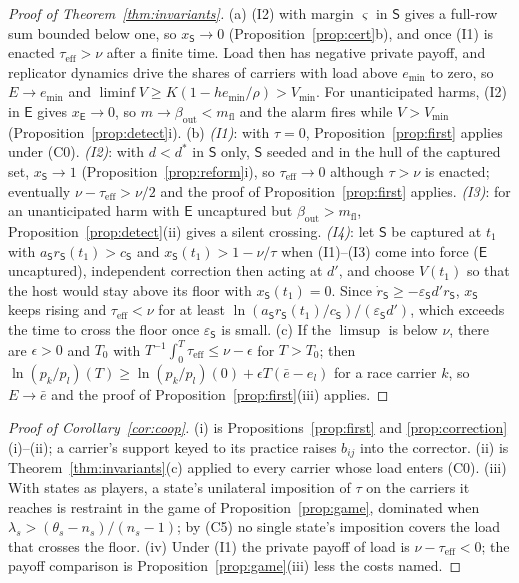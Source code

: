 \documentclass[letterpaper]{article} %
\theoremstyle{definition}
\newcommand{\dE}{\mathsf{E}}
\newcommand{\dS}{\mathsf{S}}
\newcommand{\Vmin}{V_{\min}}
\newcommand{\mfl}{m_{\mathrm{fl}}}
\newcommand{\taueff}{\tau_{\mathrm{eff}}}
\begin{document}
\begin{proof}[Proof of Theorem~\ref{thm:invariants}]
(a) (I2) with margin $\varsigma$ in $\dS$ gives a full-row sum bounded below one, so $x_\dS\to0$ (Proposition~\ref{prop:cert}b), and once (I1) is enacted $\taueff>\nu$ after a finite time. Load then has negative private payoff, and replicator dynamics drive the shares of carriers with load above $e_{\min}$ to zero, so $E\to e_{\min}$ and $\liminf V\ge K(1-he_{\min}/\rho)>\Vmin$. For unanticipated harms, (I2) in $\dE$ gives $x_\dE\to0$, so $m\to\beta_{\mathrm{out}}<\mfl$ and the alarm fires while $V>\Vmin$ (Proposition~\ref{prop:detect}i). (b) \emph{(I1)}: with $\tau=0$, Proposition~\ref{prop:first} applies under (C0). \emph{(I2)}: with $d<d^\ast$ in $\dS$ only, $\dS$ seeded and in the hull of the captured set, $x_\dS\to1$ (Proposition~\ref{prop:reform}i), so $\taueff\to0$ although $\tau>\nu$ is enacted; eventually $\nu-\taueff>\nu/2$ and the proof of Proposition~\ref{prop:first} applies. \emph{(I3)}: for an unanticipated harm with $\dE$ uncaptured but $\beta_{\mathrm{out}}>\mfl$, Proposition~\ref{prop:detect}(ii) gives a silent crossing. \emph{(I4)}: let $\dS$ be captured at $t_1$ with $a_\dS r_\dS(t_1)>c_\dS$ and $x_\dS(t_1)>1-\nu/\tau$ when (I1)--(I3) come into force ($\dE$ uncaptured), independent correction then acting at $d'$, and choose $V(t_1)$ so that the host would stay above its floor with $x_\dS(t_1)=0$. Since $\dot r_\dS\ge-\varepsilon_\dS d'r_\dS$, $x_\dS$ keeps rising and $\taueff<\nu$ for at least $\ln(a_\dS r_\dS(t_1)/c_\dS)/(\varepsilon_\dS d')$, which exceeds the time to cross the floor once $\varepsilon_\dS$ is small. (c) If the $\limsup$ is below $\nu$, there are $\epsilon>0$ and $T_0$ with $T^{-1}\int_0^T\taueff\le\nu-\epsilon$ for $T>T_0$; then $\ln(p_k/p_l)(T)\ge\ln(p_k/p_l)(0)+\epsilon T(\bar e-e_l)$ for a race carrier $k$, so $E\to\bar e$ and the proof of Proposition~\ref{prop:first}(iii) applies.
\end{proof}

\begin{proof}[Proof of Corollary~\ref{cor:coop}]
(i) is Propositions~\ref{prop:first} and \ref{prop:correction}(i)--(ii); a carrier's support keyed to its practice raises $b_{ij}$ into the corrector. (ii) is Theorem~\ref{thm:invariants}(c) applied to every carrier whose load enters (C0). (iii) With states as players, a state's unilateral imposition of $\tau$ on the carriers it reaches is restraint in the game of Proposition~\ref{prop:game}, dominated when $\lambda_s>(\theta_s-n_s)/(n_s-1)$; by (C5) no single state's imposition covers the load that crosses the floor. (iv) Under (I1) the private payoff of load is $\nu-\taueff<0$; the payoff comparison is Proposition~\ref{prop:game}(iii) less the costs named.
\end{proof}
\end{document}

